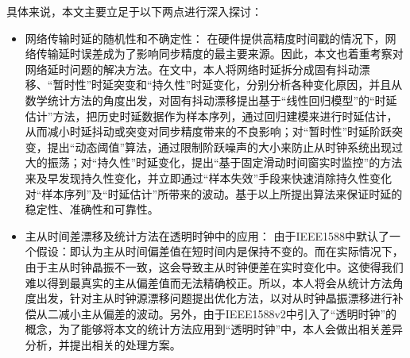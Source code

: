 具体来说，本文主要立足于以下两点进行深入探讨：
\begin{itemize}[noitemsep,topsep=0pt,parsep=0pt,partopsep=0pt]
	\item 网络传输时延的随机性和不确定性：
在硬件提供高精度时间戳的情况下，网络传输延时误差成为了影响同步精度的最主要来源。因此，本文也着重考察对网络延时问题的解决方法。在文中，本人将网络时延拆分成固有抖动漂移、“暂时性”时延突变和“持久性”时延变化，分别分析各种变化原因，并且从数学统计方法的角度出发，对固有抖动漂移提出基于“线性回归模型”的“时延估计”方法，把历史时延数据作为样本序列，通过回归建模来进行时延估计，从而减小时延抖动或突变对同步精度带来的不良影响；对“暂时性”时延阶跃突变，提出“动态阈值”算法，通过限制阶跃噪声的大小来防止从时钟系统出现过大的振荡；对“持久性”时延变化，提出“基于固定滑动时间窗实时监控”的方法来及早发现持久性变化，并立即通过“样本失效”手段来快速消除持久性变化对“样本序列”及“时延估计”所带来的波动。基于以上所提出算法来保证时延的稳定性、准确性和可靠性。
	\item 主从时间差漂移及统计方法在透明时钟中的应用：
由于IEEE1588中默认了一个假设：即认为主从时间偏差值在短时间内是保持不变的。而在实际情况下，由于主从时钟晶振不一致，这会导致主从时钟便差在实时变化中。这使得我们难以得到最真实的主从偏差值而无法精确校正。所以，本人将会从统计方法角度出发，针对主从时钟源漂移问题提出优化方法，以对从时钟晶振漂移进行补偿从二减小主从偏差的波动。另外，由于IEEE1588v2中引入了“透明时钟”的概念，为了能够将本文的统计方法应用到“透明时钟”中，本人会做出相关差异分析，并提出相关的处理方案。
\end{itemize}

